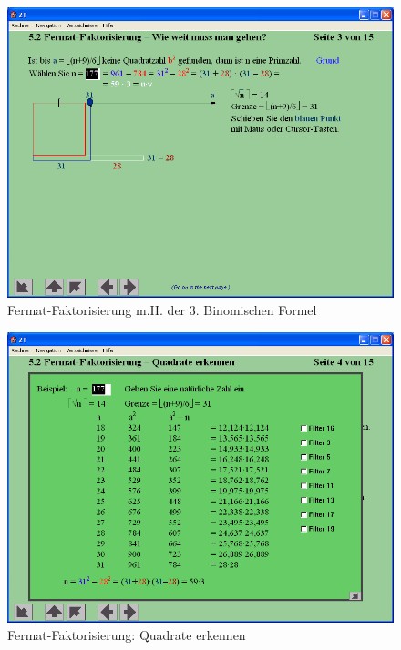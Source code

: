 \begin{refsegment}
\begin{figure}[ht]
\begin{center}
\includegraphics[scale=0.4]{figures/NT_Fig_C5-2_Fermat-factorization-How-far-1}
\caption{Fermat-Faktorisierung m.H. der 3. Binomischen Formel}
\label{NT_Fig_C5.2_Fermat-factorization-How-far-1}
\end{center}
\end{figure}


\begin{figure}[ht]
\begin{center}
\includegraphics[scale=0.4]{figures/NT_Fig_C5-2_Fermat-factorization-How-far-2}
\caption{Fermat-Faktorisierung: Quadrate erkennen}
\label{NT_Fig_C5.2_Fermat-factorization-How-far-2}
\end{center}
\end{figure}



\end{refsegment}
